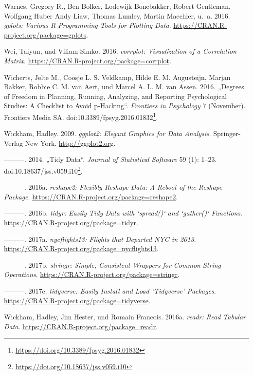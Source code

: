 \documentclass[12pt,ngerman,]{book}
\let\rmarkdownfootnote\footnote%
\def\footnote{\protect\rmarkdownfootnote}
\renewcommand{\href}[2]{#2\footnote{\url{#1}}}
\theoremstyle{definition}
\theoremstyle{definition}
\theoremstyle{remark}
\begin{document}
\hypertarget{ref-R-gplots}{}
Warnes, Gregory R., Ben Bolker, Lodewijk Bonebakker, Robert Gentleman,
Wolfgang Huber Andy Liaw, Thomas Lumley, Martin Maechler, u.~a. 2016.
\emph{gplots: Various R Programming Tools for Plotting Data}.
\url{https://CRAN.R-project.org/package=gplots}.

\hypertarget{ref-R-corrplot}{}
Wei, Taiyun, und Viliam Simko. 2016. \emph{corrplot: Visualization of a
Correlation Matrix}. \url{https://CRAN.R-project.org/package=corrplot}.

\hypertarget{ref-Wicherts2016}{}
Wicherts, Jelte M., Coosje L. S. Veldkamp, Hilde E. M. Augusteijn,
Marjan Bakker, Robbie C. M. van Aert, und Marcel A. L. M. van Assen.
2016. „Degrees of Freedom in Planning, Running, Analyzing, and Reporting
Psychological Studies: A Checklist to Avoid p-Hacking``. \emph{Frontiers
in Psychology} 7 (November). Frontiers Media SA.
doi:\href{https://doi.org/10.3389/fpsyg.2016.01832}{10.3389/fpsyg.2016.01832}.

\hypertarget{ref-R-ggplot2}{}
Wickham, Hadley. 2009. \emph{ggplot2: Elegant Graphics for Data
Analysis}. Springer-Verlag New York. \url{http://ggplot2.org}.

\hypertarget{ref-tidydata}{}
---------. 2014. „Tidy Data``. \emph{Journal of Statistical Software} 59
(1): 1--23.
doi:\href{https://doi.org/10.18637/jss.v059.i10}{10.18637/jss.v059.i10}.

\hypertarget{ref-R-reshape2}{}
---------. 2016a. \emph{reshape2: Flexibly Reshape Data: A Reboot of the
Reshape Package}. \url{https://CRAN.R-project.org/package=reshape2}.

\hypertarget{ref-R-tidyr}{}
---------. 2016b. \emph{tidyr: Easily Tidy Data with `spread()` and
`gather()` Functions}. \url{https://CRAN.R-project.org/package=tidyr}.

\hypertarget{ref-R-nycflights13}{}
---------. 2017a. \emph{nycflights13: Flights that Departed NYC in
2013}. \url{https://CRAN.R-project.org/package=nycflights13}.

\hypertarget{ref-R-stringr}{}
---------. 2017b. \emph{stringr: Simple, Consistent Wrappers for Common
String Operations}. \url{https://CRAN.R-project.org/package=stringr}.

\hypertarget{ref-R-tidyverse}{}
---------. 2017c. \emph{tidyverse: Easily Install and Load 'Tidyverse'
Packages}. \url{https://CRAN.R-project.org/package=tidyverse}.

\hypertarget{ref-readr}{}
Wickham, Hadley, Jim Hester, und Romain Francois. 2016a. \emph{readr:
Read Tabular Data}. \url{https://CRAN.R-project.org/package=readr}.
\end{document}
